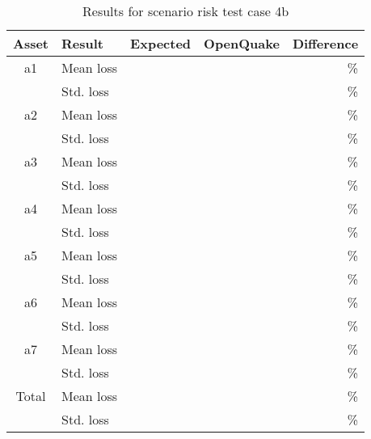 \begin{table}[htbp]

\centering
\begin{tabular}{ c l r r r }

\hline
\rowcolor{anti-flashwhite}
\bf{Asset} & \bf{Result} & \bf{Expected} & \bf{OpenQuake} & \bf{Difference}\\
\hline
a1 & Mean loss &  &  & \% \\
 & Std. loss &  &  & \% \\
\hline
a2 & Mean loss &  &  & \% \\
 & Std. loss &  &  & \% \\
\hline
a3 & Mean loss &  &  & \% \\
 & Std. loss &  &  & \% \\
\hline
a4 & Mean loss &  &  & \% \\
 & Std. loss &  &  & \% \\
\hline
a5 & Mean loss &  &  & \% \\
 & Std. loss &  &  & \% \\
\hline
a6 & Mean loss &  &  & \% \\
 & Std. loss &  &  & \% \\
\hline
a7 & Mean loss &  &  & \% \\
 & Std. loss &  &  & \% \\
\hline
Total & Mean loss &  &  & \% \\
 & Std. loss &  &  & \% \\
\hline
\end{tabular}

\caption{Results for scenario risk test case 4b}
\label{tab:result-scenario-risk-4b}
\end{table}
